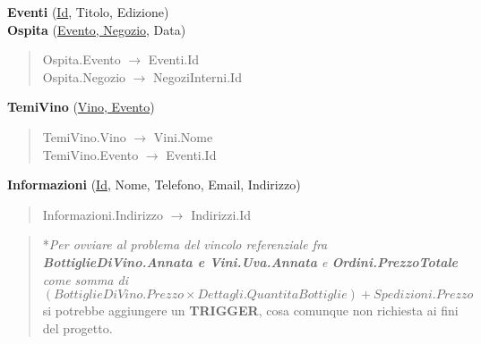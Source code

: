 \textbf{Eventi} (\underline{Id}, Titolo, Edizione)\\
\textbf{Ospita} (\underline{Evento, Negozio}, Data)
\begin{verse}
	Ospita.Evento $\to$ Eventi.Id\\
	Ospita.Negozio $\to$ NegoziInterni.Id
\end{verse}
\textbf{TemiVino} (\underline{Vino, Evento})
\begin{verse}
	TemiVino.Vino $\to$ Vini.Nome\\
	TemiVino.Evento $\to$ Eventi.Id
\end{verse}
\textbf{Informazioni} (\underline{Id}, Nome, Telefono, Email, Indirizzo)
\begin{verse}
	Informazioni.Indirizzo $\to$ Indirizzi.Id
\end{verse}


\begin{verse}
	*\emph{Per ovviare al problema del vincolo referenziale fra \textbf{BottiglieDiVino.Annata e Vini.Uva.Annata} e \textbf{Ordini.PrezzoTotale} come somma di \begin{math}(BottiglieDiVino.Prezzo \times Dettagli.QuantitaBottiglie)+ Spedizioni.Prezzo\end{math}} si potrebbe aggiungere un \textbf{TRIGGER}, cosa comunque non richiesta ai fini del progetto.
\end{verse}